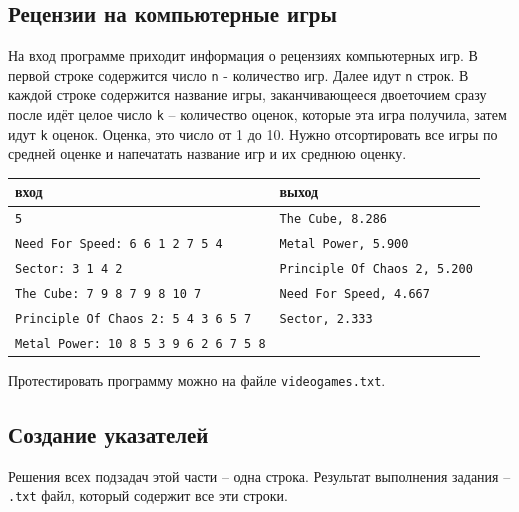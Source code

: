 \documentclass{article}
\begin{document}
\subsection{Рецензии на компьютерные игры}
На вход программе приходит информация о рецензиях компьютерных игр. В первой строке содержится число \texttt{n} - количество игр. Далее идут \texttt{n} строк. В каждой строке содержится название игры, заканчивающееся двоеточием сразу после идёт целое число \texttt{k} -- количество оценок, которые эта игра получила, затем идут \texttt{k} оценок. Оценка, это число от 1 до 10. Нужно отсортировать все игры по средней оценке и напечатать название игр и их среднюю оценку.

\begin{center}
\begin{tabular}{ l | l }
 вход & выход \\ \hline
 \texttt{5} & 								  \texttt{The Cube, 8.286} \\
 \texttt{Need For Speed: 6 6 1 2 7 5 4} &      \texttt{Metal Power, 5.900 } \\
 \texttt{Sector: 3 1 4 2} & 					  \texttt{Principle Of Chaos 2, 5.200} \\
 \texttt{The Cube: 7 9 8 7 9 8 10 7} &          \texttt{Need For Speed, 4.667 } \\
 \texttt{Principle Of Chaos 2: 5 4 3 6 5 7} &     \texttt{Sector, 2.333} \\
 \texttt{Metal Power: 10 8 5 3 9 6 2 6 7 5 8} & \\
\end{tabular}
\end{center}
Протестировать программу можно на файле \texttt{videogames.txt}.


\newpage

\subsection{Создание указателей}
Решения всех подзадач этой части -- одна строка. Результат выполнения задания -- \texttt{.txt} файл, который содержит все эти строки.
\end{document}
